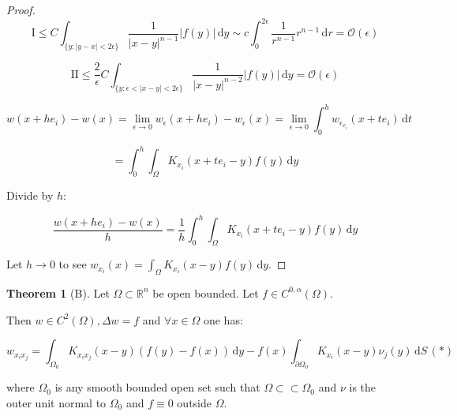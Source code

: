 \documentclass{article}
\theoremstyle{definition}
\newtheorem{theorem}{Theorem}
\begin{document}
\begin{proof}
    \[
        \text{I} \leq C \int_{\{ y : \vert y - x \vert < 2 \epsilon \} } \frac{1}{\vert x-y \vert^{n-1} } \vert f(y) \vert  \,\mathrm{d}y  \sim c \int_0^{2 \epsilon} \frac{1}{r^{n-1}} r^{n-1} \, \mathrm{d}r  = \mathcal{O}(\epsilon) 
    \]

    \[
        \text{II} \leq \frac{2}{\epsilon}C \int_{\{ y : \epsilon < \vert x-y \vert < 2\epsilon \} } \frac{1}{\vert x - y \vert ^{n-2}} \vert f(y) \vert \,\mathrm{d}y = \mathcal{O}(\epsilon)
    \]

    \[
        w(x + h e_i) - w(x) = \lim_{\epsilon  \to 0} w_{\epsilon} (x + h e_i) - w_{\epsilon} (x) = \lim_{\epsilon \to 0} \int_0^h w_{\epsilon_{x_i}}(x+te_i)\, \mathrm{d}t
    \]

    \[
        = \int_0^h \int_{\Omega} K_{x_i} (x + t e_i - y) f(y) \,\mathrm{d}y  
    \]

    Divide by \(h\):

    \[
        \frac{w(x+he_i) - w(x)}{h} = \frac{1}{h} \int_0^h \int_{\Omega} K_{x_i} (x + t e_i - y) f(y) \,\mathrm{d}y 
    \]

    Let \(h \to 0\) to see \(w_{x_i} (x) = \int_{\Omega} K_{x_i} (x-y)f(y) \,\mathrm{d}y\).

\end{proof}

\begin{theorem}
    [B] Let \(\Omega \subset \mathbb{R}^n\) be open bounded. Let \(f\in C^{0,\alpha}(\Omega)\).

    Then \(w \in C^2(\Omega), \Delta w = f\) and \(\forall x\in \Omega\) one has:

    \[
        w_{x_i x_j} = \int_{\Omega_0} K_{x_i x_j} (x-y) (f(y) - f(x)) \,\mathrm{d}y - f(x) \int_{\partial \Omega_0} K_{x_i} (x-y) \nu_j (y) \,\mathrm{d}S \, (\ast) 
    \]

    where \(\Omega_0\) is any smooth bounded open set such that \(\Omega \subset \subset \Omega_0\) and \(\nu\) is the outer unit normal to \(\Omega_0\) and \(f\equiv 0\) outside \(\Omega\).
\end{theorem}
\end{document}
